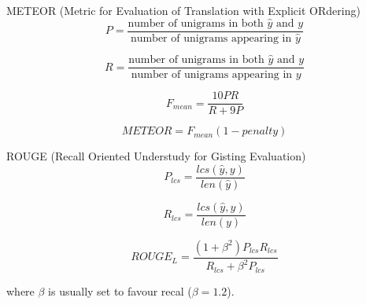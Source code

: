 \documentclass[10pt]{beamer}
\begin{document}
\begin{frame}{METEOR (Metric for Evaluation of Translation with Explicit ORdering)}
\begin{equation}
P = \frac{\text{number of } \text{unigrams in both } \hat{y} \text{ and } y}{\text{number of } \text{unigrams appearing in } \hat{y}}
\end{equation}    


\begin{equation}
R = \frac{\text{number of } \text{unigrams in both } \hat{y} \text{ and } y}{\text{number of } \text{unigrams appearing in } y}
\end{equation}    


\begin{equation}
F_{mean} = \frac{10 P R}{R + 9P}
\end{equation}

\begin{equation}
METEOR = F_{mean} (1 - penalty)
\end{equation}
\end{frame}

\begin{frame}{ROUGE (Recall Oriented Understudy for Gisting Evaluation)}
\begin{equation}
P_{lcs} = \frac{lcs(\hat{y}, y)}{len(\hat{y})}
\end{equation}    


\begin{equation}
R_{lcs} = \frac{lcs(\hat{y}, y)}{len(y)}
\end{equation}

\begin{equation}
ROUGE_L = \frac{(1 + \beta^2) P_{lcs} R_{lcs}}{R_{lcs} + \beta^{2}P_{lcs}}
\end{equation}

where $\beta$ is usually set to favour recal ($\beta = 1.2$).
\end{frame}
\end{document}
